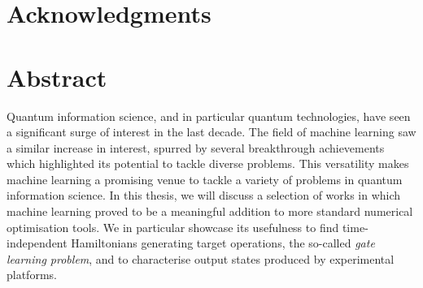 \clearpage


\chapter*{Acknowledgments}

\clearpage


\chapter*{Abstract}

Quantum information science, and in particular quantum technologies, have seen a significant surge of interest in the last decade.
The field of machine learning saw a similar increase in interest, spurred by several breakthrough achievements~\cite{mnih2015humanlevel,silver2016mastering} which highlighted its potential to tackle diverse problems.
This versatility makes machine learning a promising venue to tackle a variety of problems in quantum information science.
In this thesis, we will discuss a selection of works in which machine learning proved to be a meaningful addition to more standard numerical optimisation tools.
We in particular showcase its usefulness to find time-independent Hamiltonians generating target operations, the so-called \emph{gate learning problem}, and to characterise output states produced by experimental platforms.

